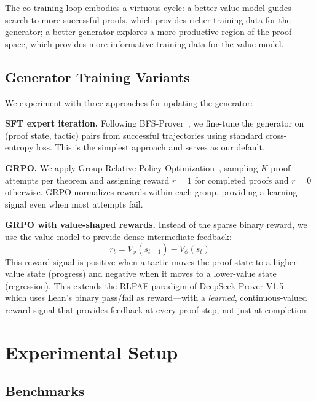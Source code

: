\documentclass{article}
\begin{document}
The co-training loop embodies a virtuous cycle: a better value model guides search to more successful proofs, which provides richer training data for the generator; a better generator explores a more productive region of the proof space, which provides more informative training data for the value model.

\subsection{Generator Training Variants}
\label{sec:generator_training}

We experiment with three approaches for updating the generator:

\textbf{SFT expert iteration.} Following BFS-Prover~\citep{xin2025bfsprover}, we fine-tune the generator on (proof state, tactic) pairs from successful trajectories using standard cross-entropy loss. This is the simplest approach and serves as our default.

\textbf{GRPO.} We apply Group Relative Policy Optimization~\citep{shao2024deepseekmath}, sampling $K$ proof attempts per theorem and assigning reward $r = 1$ for completed proofs and $r = 0$ otherwise. GRPO normalizes rewards within each group, providing a learning signal even when most attempts fail.

\textbf{GRPO with value-shaped rewards.} Instead of the sparse binary reward, we use the value model to provide dense intermediate feedback:
\begin{equation}
    r_t = V_\phi(s_{t+1}) - V_\phi(s_t)
\end{equation}
This reward signal is positive when a tactic moves the proof state to a higher-value state (progress) and negative when it moves to a lower-value state (regression). This extends the RLPAF paradigm of DeepSeek-Prover-V1.5~\citep{xin2024deepseekprover15}---which uses Lean's binary pass/fail as reward---with a \emph{learned}, continuous-valued reward signal that provides feedback at every proof step, not just at completion.

\section{Experimental Setup}
\label{sec:setup}

\subsection{Benchmarks}
\end{document}
